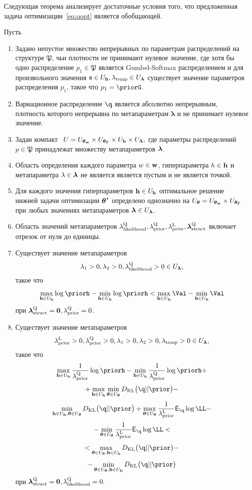 Следующая теорема анализирует достаточные условия того, что предложенная задача оптимизации~\eqref{eq:qopt} является обобщающей.
\begin{theorem}
Пусть
\begin{enumerate}%
\item Задано непустое множество непрерывных по параметрам распределений на структуре $\mathfrak{P}$, чьи плотности не принимают нулевое значение, где хотя бы одно распределение $p_1 \in \mathfrak{P}$ является Gumbel-Softmax распределением и для произвольного значения $\mathbf{s} \in U_{\mathbf{h}}, \lambda_{\text{temp}} \in U_{\boldsymbol{\lambda}}$ существует значение параметров распределения $p_1$, такое что $p_1 = \priorG$.

\item Вариационное распределение $\q$ является  абсолютно непрерывным, плотность которого непрерывна по метапараметрам $\boldsymbol{\lambda}$ и не принимает нулевое значение.

\item Задан компакт  $U = U_{\boldsymbol{\theta}_\mathbf{w}} \times U_{\boldsymbol{\theta}_{\boldsymbol{\Gamma}}} \times U_{\mathbf{h}} \times U_{\boldsymbol{\lambda}},$ где параметры распределений $p \in \mathfrak{P}$ принадлежат множеству метапараметров $\boldsymbol{\lambda}$.

\item Область определения каждого параметра $w \in\mathbf{w}$, гиперпараметра $h \in \mathbf{h}$ и метапараметра $\lambda \in \boldsymbol{\lambda}$ не является является пустым и не является точкой.

\item Для каждого значения гиперпараметров $\mathbf{h} \in U_{\mathbf{h}}$ оптимальное решение нижней задачи оптимизации $\boldsymbol{\theta}^{*}$ определено однозначно на $U_{\boldsymbol{\theta}} = U_{\boldsymbol{\theta}_\mathbf{w}} \times U_{\boldsymbol{\theta}_{\boldsymbol{\Gamma}}}$ при любых значениях метапараметров $\boldsymbol{\lambda} \in U_{\boldsymbol{\lambda}}$.

\item Область значений метапараметров $\lambda_\text{likelihood}^\text{Q}, \lambda_\text{prior}^\text{Q}, \lambda_\text{prior}^\text{L}, \boldsymbol{\lambda}_\text{struct}^\text{Q}$ включает отрезок от нуля до единицы.

\item Существует значение метапараметров $$\lambda_1>0, \lambda_2>0, \lambda_\text{likelihood}^\text{Q}>0  \in U_{\boldsymbol{\lambda}},$$ такое что
\[
\max_{\h \in \Uh} \log \priorh -\min_{\h \in \Uh}\log \priorh < \max_{\h \in \Uh} \Val - \min_{\h \in \Uh} \Val
\] 
при $\boldsymbol{\lambda}_\text{struct}^\text{Q} = \mathbf{0}, \lambda_\text{prior}^\text{Q} = 0$.

\item Существует значение метапараметров $$\lambda_\text{prior}^\text{L}>0, \lambda_\text{prior}^\text{Q}>0, \lambda_1>0, \lambda_2>0, \lambda_{\text{temp}}>0 \in U_{\boldsymbol{\lambda}},$$ такое что 
\[
    \max_{\h \in \Uh} \frac{1}{\lamCQ}\log  \priorh - \min_{\h \in \Uh} \frac{1}{\lamCQ}\log  \priorh +
\]
\[
 + \max_{\h \in \Uh} \min_{\teta \in \Uteta} \KL{\q}{\prior} -
\]
\[ \min_{\h \in \Uh, \teta \in \Uteta}  \KL{\q}{\prior} + \max_{\teta \in \Uteta}\frac{1}{\lamCL}\E_{\q} \log \LL - 
\]
\[
 - \min_{\teta \in \Uteta}\frac{1}{\lamCL}\E_{\q} \log \LL  <
\]
\[ 
< \max_{\teta \in \Uteta, \h \in \Uh} \KL{\q}{\prior} -
\]
\[
-\min_{\teta \in \Uteta, \h \in \Uh} \KL{\q}{\prior}
\]
при $\boldsymbol{\lambda}_\text{struct}^\text{Q} = \mathbf{0}, \lambda_\text{likelihood}^\text{Q} = 0.$


\end{enumerate}
\end{theorem}

